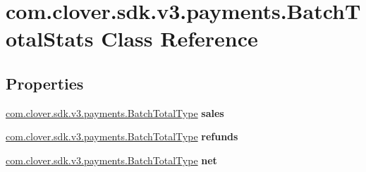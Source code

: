 \hypertarget{classcom_1_1clover_1_1sdk_1_1v3_1_1payments_1_1_batch_total_stats}{}\section{com.\+clover.\+sdk.\+v3.\+payments.\+Batch\+Total\+Stats Class Reference}
\label{classcom_1_1clover_1_1sdk_1_1v3_1_1payments_1_1_batch_total_stats}
\subsection*{Properties}
\begin{DoxyCompactItemize}
\item 
\mbox{\label{classcom_1_1clover_1_1sdk_1_1v3_1_1payments_1_1_batch_total_stats_aa3f0a3698764334b0ce30ecc97e9ba44}} 
\hyperlink{classcom_1_1clover_1_1sdk_1_1v3_1_1payments_1_1_batch_total_type}{com.\+clover.\+sdk.\+v3.\+payments.\+Batch\+Total\+Type} {\bfseries sales}
\item 
\mbox{\label{classcom_1_1clover_1_1sdk_1_1v3_1_1payments_1_1_batch_total_stats_a27ad66100138c942444268df1d7810a1}} 
\hyperlink{classcom_1_1clover_1_1sdk_1_1v3_1_1payments_1_1_batch_total_type}{com.\+clover.\+sdk.\+v3.\+payments.\+Batch\+Total\+Type} {\bfseries refunds}
\item 
\mbox{\label{classcom_1_1clover_1_1sdk_1_1v3_1_1payments_1_1_batch_total_stats_aa4b548f2b60d651f348a5014fe4a8e59}} 
\hyperlink{classcom_1_1clover_1_1sdk_1_1v3_1_1payments_1_1_batch_total_type}{com.\+clover.\+sdk.\+v3.\+payments.\+Batch\+Total\+Type} {\bfseries net}
\item 
\mbox{\label{classcom_1_1clover_1_1sdk_1_1v3_1_1payments_1_1_batch_total_stats_a09984b113532a97d133c6aa9f08e3755}} 

\end{DoxyCompactItemize}
